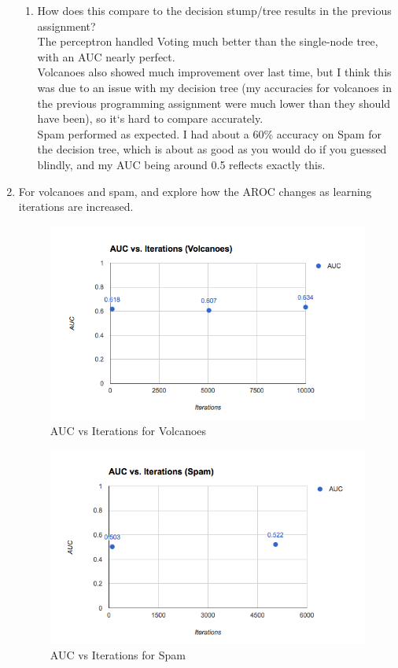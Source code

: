 \documentclass[12pt]{article}
\begin{document}
\begin{enumerate}
\begin{enumerate}
      \item How does this compare to the decision stump/tree results in the
      previous assignment?\\
        The perceptron handled Voting much better than the single-node tree,
        with an AUC nearly perfect.\\
        Volcanoes also showed much improvement over last time, but I think
        this was due to an issue with my decision tree (my accuracies for
        volcanoes in the previous programming assignment were much lower than
        they should have been), so it`s hard to compare accurately.\\
        Spam performed as expected. I had about a 60\% accuracy on Spam for the
        decision tree, which is about as good as you would do if you guessed
        blindly, and my AUC being around 0.5 reflects exactly this.
    \end{enumerate}
  \item For volcanoes and spam, and explore how the AROC changes as learning
  iterations are increased.\\
    \begin{figure}
      \includegraphics[width=\linewidth]{auc_iterations_volc.png}
      \caption{AUC vs Iterations for Volcanoes}
    \end{figure}
    \begin{figure}
      \includegraphics[width=\linewidth]{auc_iterations_spam.png}
      \caption{AUC vs Iterations for Spam}
    \end{figure}


\end{enumerate}
\end{document}
